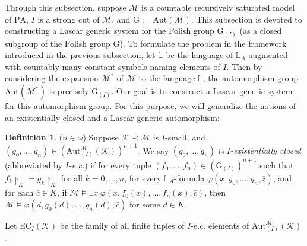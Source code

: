 \documentclass[11pt]{article}
\theoremstyle{plain}
\theoremstyle{definition}
\newtheorem{dfn}{Definition}
\newcommand{\M}{\mathcal{M}}
\newcommand{\K}{\mathcal{K}}
\newcommand{\G}{\mathrm{G}}
\newcommand{\A}{\mathrm{Aut}}
\newcommand{\Aa}{\A_{(I)}^{\M}(\K)}
\newcommand{\pa}{\mathrm{PA}}
\begin{document}
Through this subsection, suppose $\M$ is a countable recursively saturated model of $\pa$, $I $ is a strong cut of $\M$, and  $\G:=\A(\M)$. This subsection is devoted to constructing a Lascar generic system for the Polish group $\G_{(I)}$ (as a closed subgroup of the Polish group $\G$). To formulate the problem in the framework introduced in the previous subsection, let  $\mathbb{L}$ be the language of $\mathbb{L}_{A}$ augmented with countably many   constant symbols naming elements of  $I$.  Then by considering the expansion $\M^{*}$ of $\M$ to the language $\mathbb{L}$, the automorphism group  $\A(\M^{*})$ is precisely $\G_{(I)}$. Our goal is to construct a Lascar generic system for this automorphism group. For this purpose, we will generalize the notions of an existentially closed  and a Lascar generic automorphism:


 \begin{dfn}
	 ($ n\in\omega$) Suppose   $ \K\prec\M $ is $I$-small, and $ (g_{0},...,g_{n})\in(\Aa)^{n+1} $. We say $ (g_{0},...,g_{n}) $ is \textit{$I$-existentially closed} (abbreviated by \textit{$I$-e.c.}) if for every tuple  $ {(f_{0},...,f_{n})\in(\G_{(I)})^{n+1}} $ such that $f_{k}\upharpoonright_{K}=g_{k}\upharpoonright_{K}$ for all $k=0,...,n$,  for every $\mathbb{L}_{A}$-formula $ \varphi(x,y_{0},...,y_{n},\bar{z}) $, and for each $ \bar{c}\in K $, if $ \M\models\exists x \ \varphi(x,f_{0}(x),...,f_{n}(x),\bar{c}) $, then $ {\M\models\varphi(d,g_{0}(d),...,g_{n}(d),\bar{c}) }$ for some $ d\in K $.
	
	Let $\mathrm{EC}_{I}(\K)$ be the family of all finite tuples of  $I$-e.c. elements of $\Aa$.
\end{dfn}
\end{document}
